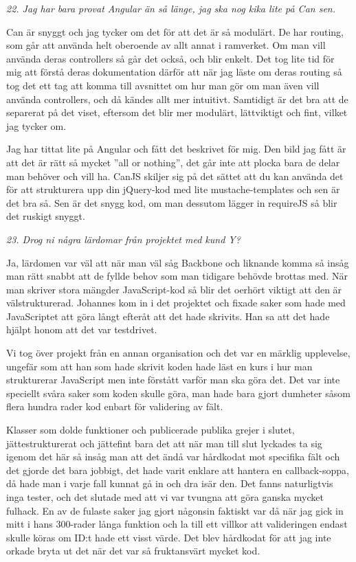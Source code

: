\documentclass[11pt]{article}
\begin{document}
\emph{22. Jag har bara provat Angular än så länge, jag ska nog kika lite på Can sen.}

Can är snyggt och jag tycker om det för att det är så modulärt. De har routing, som går att använda helt oberoende av allt annat i ramverket. Om man vill använda deras controllers så går det också, och blir enkelt. Det tog lite tid för mig att förstå deras dokumentation därför att när jag läste om deras routing så tog det ett tag att komma till avsnittet om hur man gör om man även vill använda controllers, och då kändes allt mer intuitivt. Samtidigt är det bra att de separerat på det viset, eftersom det blir mer modulärt, lättviktigt och fint, vilket jag tycker om.

Jag har tittat lite på Angular och fått det beskrivet för mig. Den bild jag fått är att det är rätt så mycket ”all or nothing”, det går inte att plocka bara de delar man behöver och vill ha. CanJS skiljer sig på det sättet att du kan använda det för att strukturera upp din jQuery-kod med lite mustache-templates och sen är det bra så. Sen är det snygg kod, om man dessutom lägger in requireJS så blir det ruskigt snyggt.

\emph{23. Drog ni några lärdomar från projektet med kund Y?}

Ja, lärdomen var väl att när man väl såg Backbone och liknande komma så insåg man rätt snabbt att de fyllde behov som man tidigare behövde brottas med. När man skriver stora mängder JavaScript-kod så blir det oerhört viktigt att den är välstrukturerad. Johannes kom in i det projektet och fixade saker som hade med JavaScriptet att göra långt efteråt att det hade skrivits. Han sa att det hade hjälpt honom att det var testdrivet.

Vi tog över projekt från en annan organisation och det var en märklig upplevelse, ungefär som att han som hade skrivit koden hade läst en kurs i hur man strukturerar JavaScript men inte förstått varför man ska göra det. Det var inte speciellt svåra saker som koden skulle göra, man hade bara gjort dumheter såsom flera hundra rader kod enbart för validering av fält.

Klasser som dolde funktioner och publicerade publika grejer i slutet, jättestrukturerat och jättefint bara det att när man till slut lyckades ta sig igenom det här så insåg man att det ändå var hårdkodat mot specifika fält och det gjorde det bara jobbigt, det hade varit enklare att hantera en callback-soppa, då hade man i varje fall kunnat gå in och dra isär den. Det fanns naturligtvis inga tester, och det slutade med att vi var tvungna att göra ganska mycket fulhack. En av de fulaste saker jag gjort någonsin faktiskt var då när jag gick in mitt i hans 300-rader långa funktion och la till ett villkor att valideringen endast skulle köras om ID:t hade ett visst värde. Det blev hårdkodat för att jag inte orkade bryta ut det när det var så fruktansvärt mycket kod.
\end{document}
